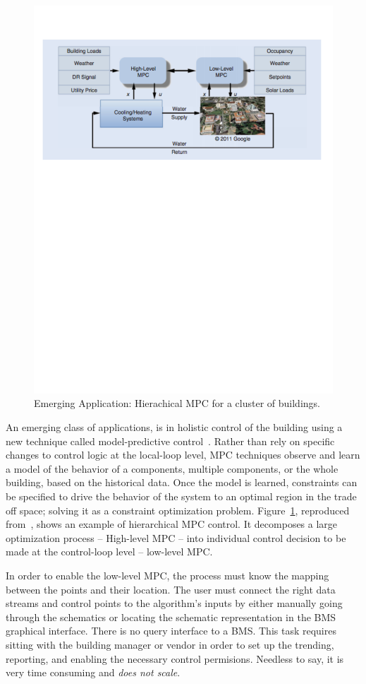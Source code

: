 \begin{figure}[t!] %
\centering
\includegraphics[width=0.75\columnwidth]{figs/mpc1}
\caption{Emerging Application: Hierachical MPC for a cluster of buildings.}
\label{fig:mpc1}
\end{figure}

An emerging class of applications, is in holistic control of the building using a new technique called model-predictive control~\cite{MPC_yudong}.
Rather than rely on specific changes to control logic at the local-loop level, MPC techniques observe and learn a model
of the behavior of a components, multiple components, or the whole building, based on the historical data.  Once the model is learned, 
constraints can be specified to drive the behavior of the system to an optimal region in the trade off space; solving it as 
a constraint optimization problem.  Figure~\ref{fig:mpc1}, reproduced from~\cite{MPC_yudong}, shows an example of hierarchical MPC control.  
It decomposes a large optimization process -- High-level MPC --  into individual control decision to be made at the control-loop level --
low-level MPC.

In order to enable the low-level MPC, the process must know the mapping between the points and their location.
The user must connect the right data streams and control points to the algorithm's inputs by either manually going through the schematics or
locating the schematic representation in the BMS graphical interface.  There is no query interface to a BMS.  This task requires sitting 
with the building manager or vendor in order to set up the trending, reporting, and enabling the necessary control permisions.
Needless to say, it is very time consuming and \emph{does not scale}.

